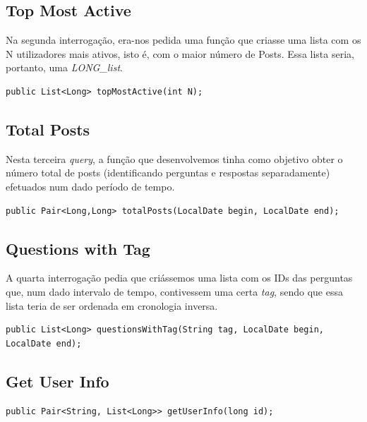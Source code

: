 \documentclass[a4paper, 11pt, oneside]{article}
\begin{document}
\subsection{Top Most Active}

Na segunda interrogação, era-nos pedida uma função que criasse uma lista com os N utilizadores mais ativos, isto é, com o maior número de Posts. Essa lista seria, 
portanto, uma \textit{LONG\_list}.

\begin{lstlisting}
public List<Long> topMostActive(int N);
\end{lstlisting}




\subsection{Total Posts}

Nesta terceira \textit{query}, a função que desenvolvemos tinha como objetivo obter o número total de posts (identificando perguntas e respostas separadamente) 
efetuados num dado período de tempo.

\begin{lstlisting}
public Pair<Long,Long> totalPosts(LocalDate begin, LocalDate end);
\end{lstlisting}



\subsection{Questions with Tag}

A quarta interrogação pedia que criássemos uma lista com os IDs das perguntas que, num dado intervalo de tempo, contivessem uma certa \textit{tag}, sendo que essa 
lista teria de ser ordenada em cronologia inversa.

\begin{lstlisting}
public List<Long> questionsWithTag(String tag, LocalDate begin, LocalDate end);
\end{lstlisting}


\subsection{Get User Info}

\begin{lstlisting}
public Pair<String, List<Long>> getUserInfo(long id);
\end{lstlisting}
\end{document}
